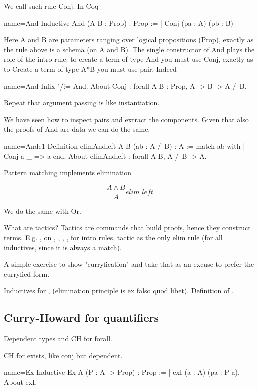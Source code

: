 We call such rule Conj.  In Coq

\begin{coq}{name=And}{}
Inductive And (A B : Prop) : Prop :=
| Conj (pa : A) (pb : B)
\end{coq}

Here A and B are parameters ranging over logical propositions (Prop),
exactly as the rule above is a schema (on A and B). The single constructor
of And plays the role of the intro rule: to create a term of type And
you must use Conj, exactly as to Create a term of type A*B you must use
pair.  Indeed

\begin{coq}{name=And}{}
Infix "/\" := And.
About Conj : forall A B : Prop, A -> B -> A /\ B.
\end{coq}

Repeat that argument passing is like instantiation.

We have seen how to inspect pairs and extract the components. Given that
also the proofs of And are data we can do the same.

\begin{coq}{name=Ande1}{}
Definition elimAndleft A B (ab : A /\ B) : A :=
match ab with
| Conj a _ => a
end.
About elimAndleft : forall A B, A /\ B -> A.
\end{coq}

Pattern matching implements elimination

$$
\frac{A \wedge B}{A}elim\_left
$$

We do the same with Or.

What are tactics?  Tactics are commands that build proofs, hence
they construct terms.  E.g. ,  on ,
, , , for intro rules.   tactic as
the only elim rule (for all inductives, since it is always a match).

A simple exercise to show "curryfication" and take that as an excuse
to prefer the curryfied form.

Inductives for ,  (elimination principle is ex falso
quod libet). Definition of .

\subsection{Curry-Howard for quantifiers}
Dependent types and CH for forall.

CH for exists, like conj but dependent.

\begin{coq}{name=Ex}{}
Inductive Ex A (P : A -> Prop) : Prop :=
| exI (a : A) (pa : P a).
About exI.
\end{coq}

